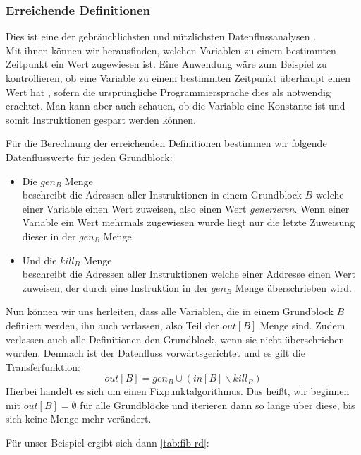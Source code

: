 \newpage
\subsubsection{Erreichende Definitionen} \label{t:rd}
Dies ist eine der gebräuchlichsten und nützlichsten Datenflussanalysen \cite[S.734]{D}.\\
Mit ihnen können wir herausfinden, welchen Variablen zu einem bestimmten
Zeitpunkt ein Wert zugewiesen ist. Eine Anwendung wäre zum Beispiel zu
kontrollieren, ob eine Variable zu einem bestimmten Zeitpunkt  überhaupt
einen Wert hat \cite[S.734]{D}, sofern die ursprüngliche Programmiersprache dies als 
notwendig erachtet. Man kann aber auch schauen, 
ob die Variable eine Konstante ist und somit Instruktionen gespart werden können.

Für die Berechnung der erreichenden Definitionen bestimmen 
wir folgende Datenflusswerte für jeden Grundblock:
\begin{itemize}
  \item Die $gen_B$ Menge\\
    beschreibt die Adressen aller Instruktionen in einem Grundblock $B$ welche einer Variable einen Wert zuweisen,
    also einen Wert \textit{generieren}. Wenn einer Variable ein Wert mehrmals zugewiesen wurde 
    liegt nur die letzte Zuweisung dieser in der $gen_B$ Menge.
  \item Und die $kill_B$ Menge\\
    beschreibt die Adressen aller Instruktionen welche einer Addresse einen Wert zuweisen, 
    der durch eine Instruktion in der $gen_B$ Menge überschrieben wird.
\end{itemize}

Nun können wir uns herleiten, dass alle Variablen, die in einem Grundblock $B$
definiert werden, ihn auch verlassen, also Teil der $out[B]$ Menge sind.
Zudem verlassen auch alle Definitionen den Grundblock, wenn sie nicht überschrieben wurden.
Demnach ist der Datenfluss vorwärtsgerichtet und es gilt die Transferfunktion:
\[out[B]=gen_B \cup (in[B] \backslash kill_B)\]
Hierbei handelt es sich um einen Fixpunktalgorithmus. Das heißt, wir beginnen
mit $out[B]=\emptyset$ für alle Grundblöcke und iterieren dann so lange über diese,
bis sich keine Menge mehr verändert.\cite[S.739-740]{D}

Für unser Beispiel ergibt sich dann \cref{tab:fib-rd}:

